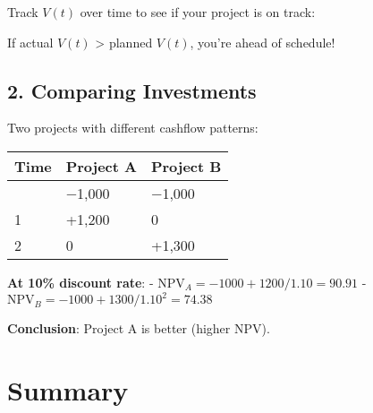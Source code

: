 \documentclass[
  letterpaper,
]{scrbook}
\begin{document}
Track \(V(t)\) over time to see if your project is on track:

\begin{figure}[h]
\centering
{}
\end{figure}

\FloatBarrier

If actual \(V(t)\) \textgreater{} planned \(V(t)\), you're ahead of
schedule!

\subsection{2. Comparing Investments}\label{comparing-investments}

Two projects with different cashflow patterns:

\begin{longtable}[]{@{}lll@{}}
\toprule\noalign{}
Time & Project A & Project B \\
\midrule\noalign{}
\endhead
\bottomrule\noalign{}
\endlastfoot
0 & −1,000 & −1,000 \\
1 & +1,200 & 0 \\
2 & 0 & +1,300 \\
\end{longtable}

\textbf{At 10\% discount rate}: -
\(\text{NPV}_A = -1000 + 1200/1.10 = 90.91\) -
\(\text{NPV}_B = -1000 + 1300/1.10^2 = 74.38\)

\textbf{Conclusion}: Project A is better (higher NPV).

\section{Summary}\label{summary-2}
\end{document}

